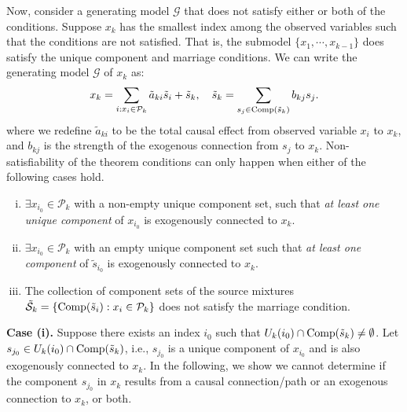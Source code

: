 \documentclass[12pt]{article}
\newcommand{\setS}{\mathcal{S}}
\begin{document}
Now, consider a generating model $\mathcal{G}$ that does not satisfy either or both of the conditions. Suppose $x_k$ has the smallest index among the observed variables such that the conditions are not satisfied. That is, the submodel $\{x_{1},\cdots,x_{k-1}\}$ does satisfy the unique component and marriage conditions.
We can write the generating model $\mathcal{G}$ of $x_k$ as:
\begin{equation}
x_k = \sum_{i: x_i\in \mathcal{P}_k} \tilde{a}_{k i} \tilde{s}_{i} + \tilde{s}_k,\quad \tilde{s}_k = \sum_{s_j\in {\rm{Comp}}(\tilde{s}_k) } b_{kj}s_j.
\label{eq:form}
\end{equation}
where we redefine $\tilde{a}_{ki}$ to be the total causal effect from observed variable $x_i$ to $x_k$, and $b_{kj}$ is the strength of the exogenous connection from $s_j$ to $x_k$. %
Non-satisfiability of the theorem conditions can only happen when either of the following cases hold. 
\begin{enumerate}[(i)]
\item $\exists x_{i_0}\in \mathcal{P}_k$ with a non-empty unique component set, such that {\it{at least one unique component}} of $x_{i_0}$ is exogenously connected to $x_k$.
\item $\exists x_{i_0}\in \mathcal{P}_k$ with an empty unique component set such that {\it{at least one component}} of $\tilde{s}_{i_0}$ is exogenously connected to $x_k$.
\item The collection of component sets of the source mixtures $\tilde{\setS}_k= \{ {\rm{Comp}}(\tilde{s}_i) :x_i\in\mathcal{P}_k\}$ does not satisfy the marriage condition.
\end{enumerate}

\textbf{Case (i). }
Suppose there exists an index $i_0$ such that $U_k(i_0)\cap {\rm{Comp}}(\tilde{s}_k) \neq \emptyset $. Let $s_{j_0}\in U_k(i_0)\cap {\rm{Comp}}(\tilde{s}_k)$, i.e., $s_{j_0}$ is a unique component of $x_{i_0}$ and is also exogenously connected to $x_k$. In the following, we show we cannot determine if the component $s_{j_0}$ in $x_k$ results from a causal connection/path or an exogenous connection to $x_k$, or both. 
\end{document}
